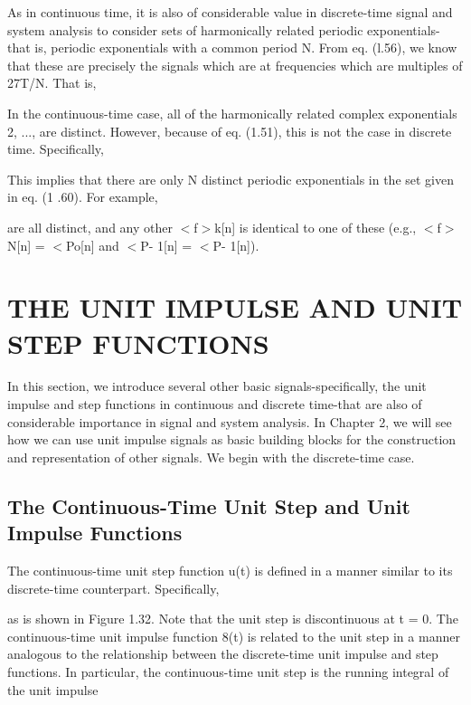 \documentclass{report}
\begin{document}
As in continuous time, it is also of considerable value in discrete-time signal and system analysis to consider sets of harmonically related periodic
exponentials-that is, periodic exponentials with a common period N. From eq. (l.56), we know that these are precisely the signals which are at frequencies
which are multiples of 27T/N. That is,



In the { }continuous-time case, all of the harmonically related complex exponentials { } 2, ..., are distinct. However, because of eq. (1.51), this
is not the case in discrete time. Specifically,



This implies that there are only N distinct periodic exponentials in the set given in eq. (1 .60). For example,



are all distinct, and any other $<$f$>$k[n] is identical to one of these (e.g., $<$f$>$N[n] = $<$Po[n] and $<$P- 1[n] = $<$P- 1[n]).

\section*{THE UNIT IMPULSE AND UNIT STEP FUNCTIONS}

In this section, we introduce several other basic signals-specifically, the unit impulse and step functions in continuous and discrete time-that
are also of considerable importance in signal and system analysis. In Chapter 2, we will see how we can use unit impulse signals as basic building
blocks for the construction and representation of other signals. We begin with the discrete-time case.

\subsection*{The Continuous-Time Unit Step and Unit Impulse Functions}

The continuous-time unit step function u(t) is defined in a manner similar to its discrete-time counterpart. Specifically,



as is shown in Figure 1.32. Note that the unit step is discontinuous at t = 0. The continuous-time unit impulse function 8(t) is related to the unit
step in a manner analogous to the relationship between the discrete-time unit impulse and step functions. In particular, the continuous-time unit
step is the running integral of the unit impulse
\end{document}
